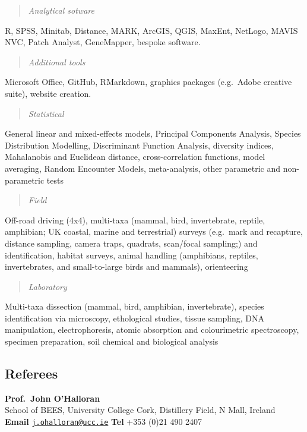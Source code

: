 \documentclass[]{article}
\begin{document}
\begin{quote}
\emph{Analytical sotware}
\end{quote}

R, SPSS, Minitab, Distance, MARK, ArcGIS, QGIS, MaxEnt, NetLogo, MAVIS
NVC, Patch Analyst, GeneMapper, bespoke software.

\begin{quote}
\emph{Additional tools}
\end{quote}

Microsoft Office, GitHub, RMarkdown, graphics packages (e.g.~Adobe
creative suite), website creation.

\begin{quote}
\emph{Statistical}
\end{quote}

General linear and mixed-effects models, Principal Components Analysis,
Species Distribution Modelling, Discriminant Function Analysis,
diversity indices, Mahalanobis and Euclidean distance, cross-correlation
functions, model averaging, Random Encounter Models, meta-analysis,
other parametric and non-parametric tests

\begin{quote}
\emph{Field}
\end{quote}

Off-road driving (4x4), multi-taxa (mammal, bird, invertebrate, reptile,
amphibian; UK coastal, marine and terrestrial) surveys (e.g.~mark and
recapture, distance sampling, camera traps, quadrats, scan/focal
sampling;) and identification, habitat surveys, animal handling
(amphibians, reptiles, invertebrates, and small-to-large birds and
mammals), orienteering

\begin{quote}
\emph{Laboratory}
\end{quote}

Multi-taxa dissection (mammal, bird, amphibian, invertebrate), species
identification via microscopy, ethological studies, tissue sampling, DNA
manipulation, electrophoresis, atomic absorption and colourimetric
spectroscopy, specimen preparation, soil chemical and biological
analysis

\newpage

\subsection{Referees}\label{referees}

\textbf{Prof.~John O'Halloran}\\
School of BEES, University College Cork, Distillery Field, N Mall,
Ireland\\
\textbf{Email}
\href{mailto:j.ohalloran@ucc.ie}{\nolinkurl{j.ohalloran@ucc.ie}}
\textbf{Tel} +353 (0)21 490 2407
\end{document}
